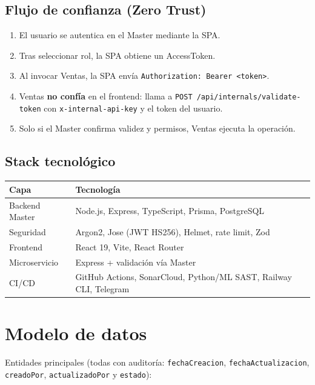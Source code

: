 \documentclass[12pt,a4paper]{article}
\begin{document}
\subsection{Flujo de confianza (Zero Trust)}
\begin{enumerate}[leftmargin=1.5em]
  \item El usuario se autentica en el Master mediante la SPA.
  \item Tras seleccionar rol, la SPA obtiene un AccessToken.
  \item Al invocar Ventas, la SPA envía \texttt{Authorization: Bearer <token>}.
  \item Ventas \textbf{no confía} en el frontend: llama a
        \texttt{POST /api/internals/validate-token} con
        \texttt{x-internal-api-key} y el token del usuario.
  \item Solo si el Master confirma validez y permisos, Ventas ejecuta la operación.
\end{enumerate}

\subsection{Stack tecnológico}
\begin{center}
\begin{tabular}{@{}ll@{}}
\toprule
\textbf{Capa} & \textbf{Tecnología} \\
\midrule
Backend Master & Node.js, Express, TypeScript, Prisma, PostgreSQL \\
Seguridad & Argon2, Jose (JWT HS256), Helmet, rate limit, Zod \\
Frontend & React 19, Vite, React Router \\
Microservicio & Express + validación vía Master \\
CI/CD & GitHub Actions, SonarCloud, Python/ML SAST, Railway CLI, Telegram \\
\bottomrule
\end{tabular}
\end{center}

\section{Modelo de datos}
Entidades principales (todas con auditoría: \texttt{fechaCreacion},
\texttt{fechaActualizacion}, \texttt{creadoPor}, \texttt{actualizadoPor} y
\texttt{estado}):
\end{document}
